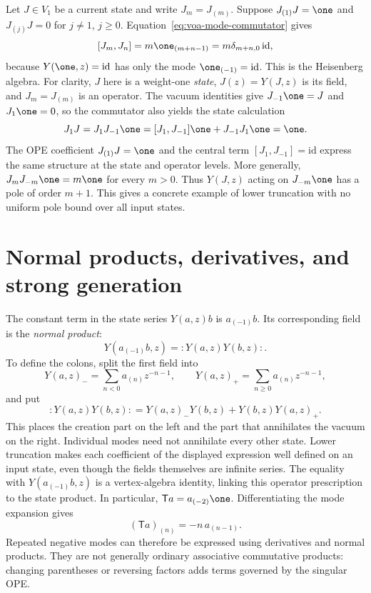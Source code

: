 \begin{example}
Let $J\in V_1$ be a current state and write $J_m=J_{(m)}$.
Suppose $J_{(1)}J=\one$ and $J_{(j)}J=0$ for $j\ne1$, $j\ge0$.
Equation~\eqref{eq:voa-mode-commutator} gives
\[
 [J_m,J_n]=m\one_{(m+n-1)}=m\delta_{m+n,0}\,\mathrm{id},
\]
because $Y(\one,z)=\mathrm{id}$ has only the mode
$\one_{(-1)}=\mathrm{id}$. This is the Heisenberg algebra.
For clarity, $J$ here is a weight-one \emph{state},
$J(z)=Y(J,z)$ is its field, and $J_m=J_{(m)}$ is an operator.
The vacuum identities give $J_{-1}\one=J$ and $J_1\one=0$,
so the commutator also yields the state calculation
\[
 J_1J=J_1J_{-1}\one
     =[J_1,J_{-1}]\one+J_{-1}J_1\one=\one.
\]
The OPE coefficient $J_{(1)}J=\one$ and the central term
$[J_1,J_{-1}]=\mathrm{id}$ express the same structure at the
state and operator levels. More generally,
$J_mJ_{-m}\one=m\one$ for every $m>0$. Thus $Y(J,z)$ acting
on $J_{-m}\one$ has a pole of order $m+1$. This gives a concrete
example of lower truncation with no uniform pole bound over all
input states.
\end{example}

\section{Normal products, derivatives, and strong generation}

The constant term in the state series $Y(a,z)b$ is $a_{(-1)}b$.
Its corresponding field is the \emph{normal product}:
\[
 Y(a_{(-1)}b,z)=:Y(a,z)Y(b,z):.
\]
To define the colons, split the first field into
\[
 Y(a,z)_-=\sum_{n<0}a_{(n)}z^{-n-1},\qquad
 Y(a,z)_+=\sum_{n\ge0}a_{(n)}z^{-n-1},
\]
and put
\[
 :Y(a,z)Y(b,z):
   =Y(a,z)_-Y(b,z)+Y(b,z)Y(a,z)_+.
\]
This places the creation part on the left and the part that
annihilates the vacuum on the right. Individual modes need not
annihilate every other state. Lower truncation makes each
coefficient of the displayed expression well defined on an input
state, even though the fields themselves are infinite series.
The equality with $Y(a_{(-1)}b,z)$ is a vertex-algebra identity,
linking this operator prescription to the state product.
In particular,
$\mathsf Ta=a_{(-2)}\one$. Differentiating the mode expansion gives
\begin{equation}
 (\mathsf Ta)_{(n)}=-n\,a_{(n-1)}.
 \label{eq:voa-derivative-mode}
\end{equation}
Repeated negative modes can therefore be expressed using derivatives
and normal products. They are not generally ordinary associative
commutative products: changing parentheses or reversing factors adds
terms governed by the singular OPE.

